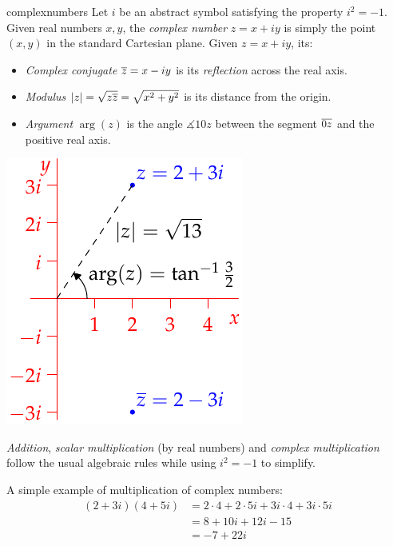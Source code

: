 \begin{defn}[lower separated=false, sidebyside, sidebyside align=top seam, sidebyside gap=0pt, righthand width=0.32\linewidth]{}{complexnumbers}
Let $i$ be an abstract symbol satisfying the property $i^2=-1$.\smallbreak
Given real numbers $x,y$, the \emph{complex number} $z=x+iy$ is simply the point $(x,y)$ in the standard Cartesian plane.\footnotemark\smallbreak
Given $z=x+iy$, its:\vspace{-5pt}
\begin{itemize}\itemsep0pt
  \item \emph{Complex conjugate} $\overline{z}=x-iy$ is its \emph{reflection} across the real axis.
  \item \emph{Modulus} $\left| z\right|=\sqrt{z\overline{z}}=\sqrt{x^2+y^2}$ is its distance from the origin.
  \item \emph{Argument} $\arg(z)$ is the angle $\measuredangle 10z$ between the segment $\overline{0z}$ and the positive real axis. 
\end{itemize}
\tcblower
\flushright\includegraphics[scale=0.9]{complex-argand}
\end{defn}


\emph{Addition}, \emph{scalar multiplication} (by real numbers) and \emph{complex multiplication} follow the usual algebraic rules while using $i^2=-1$ to simplify.

\begin{example}{}{}
A simple example of multiplication of complex numbers:
\begin{align*}
(2+3i)(4+5i)&=2\cdot 4+2\cdot 5i+3i\cdot 4+3i\cdot 5i\tag{multiply out}\\
&=8+10i+12i-15 \tag{use $i^2=-1$ to simplify}\\
&=-7+22i
\end{align*}
\end{example}

